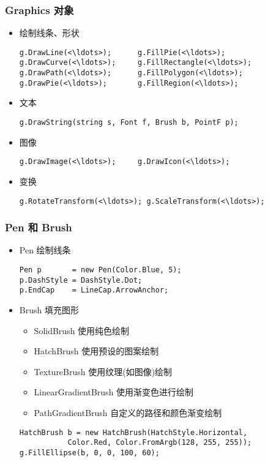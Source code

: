 \begin{frame}[fragile]
\frametitle{Graphics 对象}
\begin{itemize}
\item 绘制线条、形状
\begin{lstlisting}[escapeinside=<>]
g.DrawLine(<\ldots>);      g.FillPie(<\ldots>);
g.DrawCurve(<\ldots>);     g.FillRectangle(<\ldots>);
g.DrawPath(<\ldots>);      g.FillPolygon(<\ldots>);
g.DrawPie(<\ldots>);       g.FillRegion(<\ldots>);
\end{lstlisting}
\item 文本
\begin{lstlisting}
g.DrawString(string s, Font f, Brush b, PointF p);
\end{lstlisting}
\item 图像
\begin{lstlisting}[escapeinside=<>]
g.DrawImage(<\ldots>);     g.DrawIcon(<\ldots>);
\end{lstlisting}
\item 变换
\begin{lstlisting}[escapeinside=<>]
g.RotateTransform(<\ldots>); g.ScaleTransform(<\ldots>);
\end{lstlisting}
\end{itemize}
\end{frame}

\begin{frame}[fragile]
\frametitle{Pen 和 Brush}
\begin{itemize}
\item Pen 绘制线条
\begin{lstlisting}
Pen p       = new Pen(Color.Blue, 5);
p.DashStyle = DashStyle.Dot;
p.EndCap    = LineCap.ArrowAnchor;
\end{lstlisting}
\item Brush 填充图形
\begin{itemize}
\item SolidBrush 使用纯色绘制
\item HatchBrush 使用预设的图案绘制
\item TextureBrush 使用纹理(如图像)绘制
\item LinearGradientBrush 使用渐变色进行绘制
\item PathGradientBrush 自定义的路径和颜色渐变绘制
\end{itemize}
\begin{lstlisting}
HatchBrush b = new HatchBrush(HatchStyle.Horizontal,
           Color.Red, Color.FromArgb(128, 255, 255));
g.FillEllipse(b, 0, 0, 100, 60);
\end{lstlisting}
\end{itemize}
\end{frame}

